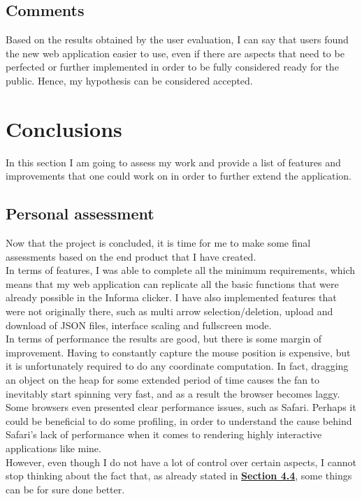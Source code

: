 \documentclass[]{usiinfbachelorproject}
\begin{document}
\vspace{\fill}
\pagebreak

\subsection{Comments}

Based on the results obtained by the user evaluation, I can say that users found the new web application easier to use, even if there are aspects that need to be perfected or further implemented in order to be fully considered ready for the public. Hence, my hypothesis can be considered accepted.

\vspace{\fill}
\pagebreak

\section{Conclusions} \label{Conclusions}

In this section I am going to assess my work and provide a list of features and improvements that one could work on in order to further extend the application.

\subsection{Personal assessment}

Now that the project is concluded, it is time for me to make some final assessments based on the end product that I have created. \\
In terms of features, I was able to complete all the minimum requirements, which means that my web application can replicate all the basic functions that were already possible in the Informa clicker. I have also implemented features that were not originally there, such as multi arrow selection/deletion, upload and download of JSON files, interface scaling and fullscreen mode.\\
In terms of performance the results are good, but there is some margin of improvement. Having to constantly capture the mouse position is expensive, but it is unfortunately required to do any coordinate computation. In fact, dragging an object on the heap for some extended period of time causes the fan to inevitably start spinning very fast, and as a result the browser becomes laggy. Some browsers even presented clear performance issues, such as Safari. Perhaps it could be beneficial to do some profiling, in order to understand the cause behind Safari's lack of performance when it comes to rendering highly interactive applications like mine. \\
However, even though I do not have a lot of control over certain aspects, I cannot stop thinking about the fact that, as already stated in \hyperref[storing states]{\textbf{Section 4.4}}, some things can be for sure done better.
\end{document}
